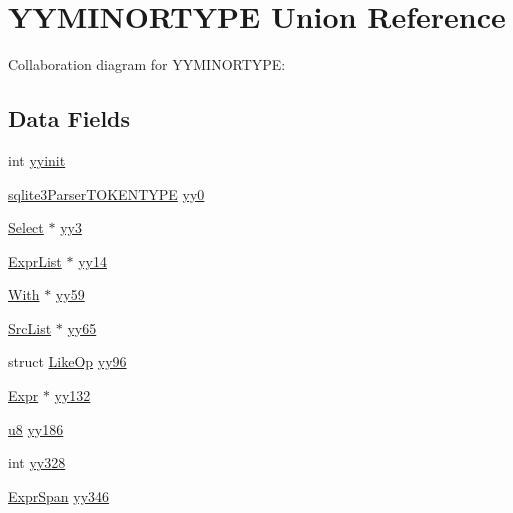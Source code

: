 \hypertarget{union_y_y_m_i_n_o_r_t_y_p_e}{}\section{Y\+Y\+M\+I\+N\+O\+R\+T\+Y\+P\+E Union Reference}
\label{union_y_y_m_i_n_o_r_t_y_p_e}


Collaboration diagram for Y\+Y\+M\+I\+N\+O\+R\+T\+Y\+P\+E\+:
\subsection*{Data Fields}
\begin{DoxyCompactItemize}
\item 
int \hyperlink{union_y_y_m_i_n_o_r_t_y_p_e_a0cb008d540fdfbd8d959086ac51430d9}{yyinit}
\item 
\hyperlink{sqlite3_8c_a37d8d9e681b010c65b9932860dd4f0da}{sqlite3\+Parser\+T\+O\+K\+E\+N\+T\+Y\+P\+E} \hyperlink{union_y_y_m_i_n_o_r_t_y_p_e_a527c9f75bd39917886d90305da19803c}{yy0}
\item 
\hyperlink{struct_select}{Select} $\ast$ \hyperlink{union_y_y_m_i_n_o_r_t_y_p_e_a6d4889fe33d2ca4eba086973aee4c755}{yy3}
\item 
\hyperlink{struct_expr_list}{Expr\+List} $\ast$ \hyperlink{union_y_y_m_i_n_o_r_t_y_p_e_a71fb717f0141b38b92f35b6739366677}{yy14}
\item 
\hyperlink{struct_with}{With} $\ast$ \hyperlink{union_y_y_m_i_n_o_r_t_y_p_e_a2daac3ebedf88fcb7e00c0a723e3f8b8}{yy59}
\item 
\hyperlink{struct_src_list}{Src\+List} $\ast$ \hyperlink{union_y_y_m_i_n_o_r_t_y_p_e_a71a8259822c811a8fc0f1f892909122d}{yy65}
\item 
struct \hyperlink{struct_like_op}{Like\+Op} \hyperlink{union_y_y_m_i_n_o_r_t_y_p_e_a2f23d14f37b365fa5cce1bd83276b6fd}{yy96}
\item 
\hyperlink{struct_expr}{Expr} $\ast$ \hyperlink{union_y_y_m_i_n_o_r_t_y_p_e_a36d8a69a92bd00d6640392cedea66970}{yy132}
\item 
\hyperlink{sqlite3_8c_a74a0f6424ae628af25f23f0a35f6ead3}{u8} \hyperlink{union_y_y_m_i_n_o_r_t_y_p_e_af1c2f4cf68876158541b6fbb08508d9c}{yy186}
\item 
int \hyperlink{union_y_y_m_i_n_o_r_t_y_p_e_ac69f548f34beb69c83e03ae8d6b5a699}{yy328}
\item 
\hyperlink{struct_expr_span}{Expr\+Span} \hyperlink{union_y_y_m_i_n_o_r_t_y_p_e_a6ba7dcd49df63a355123e3c02f2c6e8e}{yy346}
\item 

\end{DoxyCompactItemize}
